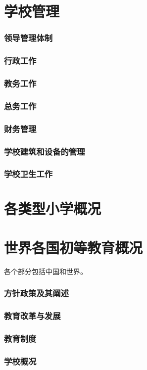 \documentclass[UTF8]{../../ApplicationUniverse}
\begin{document}
\section{学校管理}
    \subsubsection{领导管理体制}
    \subsubsection{行政工作}
    \subsubsection{教务工作}
    \subsubsection{总务工作}
    \subsubsection{财务管理}
    \subsubsection{学校建筑和设备的管理}
    \subsubsection{学校卫生工作}
\section{各类型小学概况}
\section{世界各国初等教育概况}

各个部分包括中国和世界。
    \subsubsection{方针政策及其阐述}
    \subsubsection{教育改革与发展}
    \subsubsection{教育制度}
    \subsubsection{学校概况}
\end{document}

